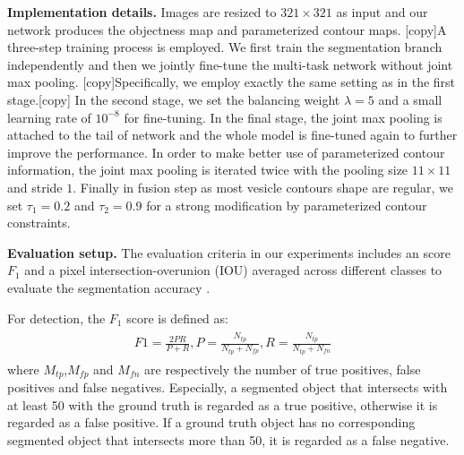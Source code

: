 \noindent\textbf{Implementation details.} 
Images are resized to $321\times 321$ as input and our network produces the objectness map and parameterized contour maps.
[copy]A three-step training process is employed.
We first train the segmentation branch independently and then we jointly fine-tune the multi-task network without joint max pooling.
[copy]Specifically, we employ exactly the same setting as \cite{Chen2014a} in the first stage.[copy]
%
In the second stage, we set the balancing weight $\lambda=5$ and a small learning rate of $10^{-8}$ for fine-tuning.
%
In the final stage, the joint max pooling is attached to the tail of network and the whole model is fine-tuned again to further improve the performance.
%
In order to make better use of parameterized contour information, the joint max pooling is iterated twice with the pooling size $11\times 11$ and stride $1$.
%
Finally in  fusion step as most vesicle contours shape are regular, we set $\tau_1=0.2$ and $\tau_2=0.9$ for a strong modification by parameterized contour constraints.

\noindent\textbf{Evaluation setup.}
%
The evaluation criteria in our experiments includes an score $F_1$  and a pixel intersection-overunion (IOU) averaged across different classes to evaluate the segmentation accuracy .

For detection, the $F_1$ score is defined as:
%
\begin{eqnarray}\label{fusion}
\begin{aligned}
F1 = \frac{2PR}{P+R},P=\frac{N_{tp}}{N_{tp}+N_{fp}},R=\frac{N_{tp}}{N_{tp}+N_{fn}}
\end{aligned}
\end{eqnarray}
where $M_{tp}$,$M_{fp}$ and $M_{fn}$ are respectively the number of true positives, false positives and false negatives.
Especially, a segmented object that intersects with at least 50 with the ground truth is regarded as a true positive, otherwise it is regarded as a false positive.
If a ground truth object has no corresponding segmented object that intersects more than 50, it is regarded as a false negative.

